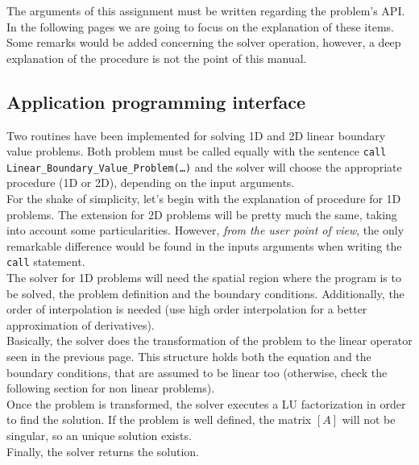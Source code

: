 The arguments of this assignment must be written regarding the problem's API. In
the following pages we are going to focus on the explanation of these items.
Some remarks would be added concerning the solver operation, however, a deep
explanation of the procedure is not the point of this manual. \\

\newpage


\subsection{Application programming interface}

Two routines have been implemented for solving 1D and 2D linear boundary value
problems. Both problem must be called equally with the sentence \texttt{call
Linear\_Boundary\_Value\_Problem(\ldots)} and the solver will choose the
appropriate procedure (1D or 2D), depending on the input arguments. \\

For the shake of simplicity, let's begin with the explanation of procedure for
1D problems.
The extension for 2D problems will be pretty much the same, taking into account some
particularities. However, \textit{from the user point of view}, the only
remarkable difference would be found in the inputs arguments when writing the
\texttt{call} statement. \\

The solver for 1D problems will need the spatial region where the program is to
be solved, the problem definition and the boundary conditions. Additionally, the
order of interpolation is needed (use high order interpolation for a better
approximation of derivatives). \\

Basically, the solver does the transformation of the problem to the
linear operator seen in the previous page. This structure holds both the
equation and the boundary conditions, that are assumed to be linear too
(otherwise, check the following section for non linear problems). \\

Once the problem is transformed, the solver executes a LU factorization in order
to find the solution. If the problem is well defined, the matrix $[A]$ will not
be singular, so an unique solution exists.\\

Finally, the solver returns the solution.\\

